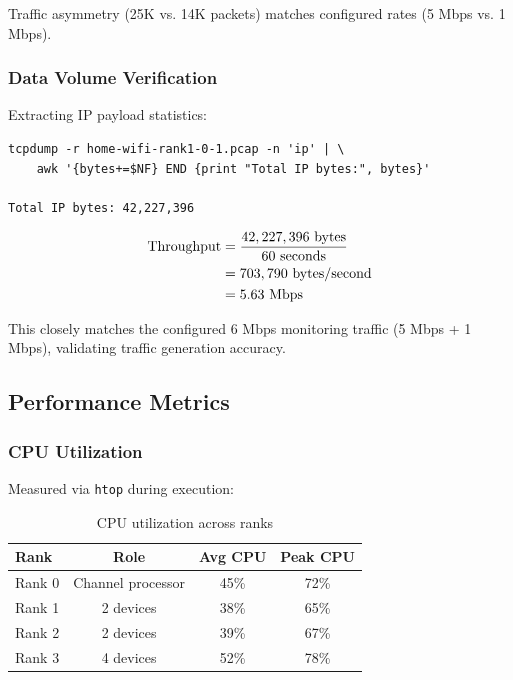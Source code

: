 Traffic asymmetry (25K vs. 14K packets) matches configured rates (5 Mbps vs. 1 Mbps).

\subsubsection{Data Volume Verification}

Extracting IP payload statistics:

\begin{lstlisting}[style=bash]
tcpdump -r home-wifi-rank1-0-1.pcap -n 'ip' | \
    awk '{bytes+=$NF} END {print "Total IP bytes:", bytes}'

Total IP bytes: 42,227,396
\end{lstlisting}

\begin{align}
\text{Throughput} &= \frac{42,227,396 \text{ bytes}}{60 \text{ seconds}} \notag \\
&= 703,790 \text{ bytes/second} \notag \\
&= 5.63 \text{ Mbps}
\end{align}

This closely matches the configured 6 Mbps monitoring traffic (5 Mbps + 1 Mbps), validating traffic generation accuracy.

\subsection{Performance Metrics}

\subsubsection{CPU Utilization}

Measured via \texttt{htop} during execution:

\begin{table}[htbp]
\centering
\caption{CPU utilization across ranks}
\label{tab:cpu-usage}
\begin{tabular}{@{}lccc@{}}
\toprule
\textbf{Rank} & \textbf{Role} & \textbf{Avg CPU} & \textbf{Peak CPU} \\
\midrule
Rank 0 & Channel processor & 45\% & 72\% \\
Rank 1 & 2 devices & 38\% & 65\% \\
Rank 2 & 2 devices & 39\% & 67\% \\
Rank 3 & 4 devices & 52\% & 78\% \\
\bottomrule
\end{tabular}
\end{table}

